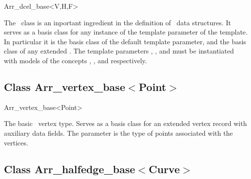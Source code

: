 
\ccRefPageBegin

\begin{ccRefClass}{Arr_dcel_base<V,H,F>}
\label{arr_ref:arr_dcel_base}
    
\ccDefinition

The \ccClassTemplateName\ class is an inportant ingredient in the
definition of \dcel\ data structures. It serves as a basis class for
any instance of the  template parameter of the
 template. In particular it is the basis class of
the default  template parameter, and the basis class of any
extended \dcel. The template parameters , , and 
must be instantiated with models of the concepts
, ,
and  respectively.

 
\ccIsModel


\subsection*{Class Arr\_vertex\_base$<$Point$>$}

\begin{ccClass}{Arr_vertex_base<Point>}

\ccDefinition

The basic \dcel\ vertex type. Serves as a basis class for an extended
vertex record with auxiliary data fields. The  parameter is
the type of points associated with the vertices.

\ccIsModel

\end{ccClass}


\subsection*{Class Arr\_halfedge\_base$<$Curve$>$}


\end{ccRefClass}
